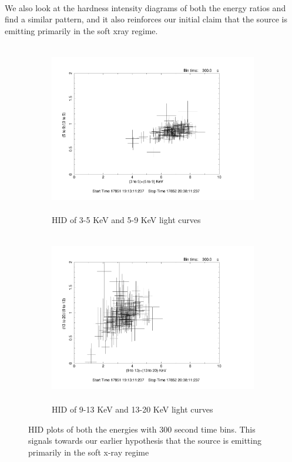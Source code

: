\documentclass[a4paper,twoside]{report}
\numberwithin{equation}{section}
\begin{document}
\paragraph{}
We also look at the hardness intensity diagrams of both the energy ratios and find a similar pattern, and it also reinforces our initial claim that the source is emitting primarily in the soft xray regime. \\
\begin{figure}[h]
\begin{subfigure}{0.48\textwidth}
\includegraphics[width=1.0\linewidth, height=7.5cm]{3-5_5-9_HID_300s.pdf}
\caption{HID of 3-5 KeV and 5-9 KeV light curves}
\label{HID1_300s}
\end{subfigure}
\begin{subfigure}{0.48\textwidth}
\includegraphics[width=1.0\linewidth, height=7.5cm]{9-13_13-20_HID_300s.pdf}
\caption{HID of 9-13 KeV and 13-20 KeV light curves}
\label{HID2_300s}
\end{subfigure}
\caption{HID plots of both the energies with 300 second time bins. This signals towards our earlier hypothesis that the source is emitting primarily in the soft x-ray regime}
\end{figure}
\end{document}
